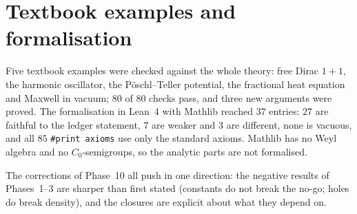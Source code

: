 \section{Textbook examples and formalisation}

Five textbook examples were checked against the whole theory: free Dirac $1+1$, the harmonic oscillator, the P\"oschl--Teller potential, the fractional heat equation and Maxwell in vacuum; $80$ of $80$ checks pass, and three new arguments were proved. The formalisation in Lean~4 with Mathlib reached $37$ entries: $27$ are faithful to the ledger statement, $7$ are weaker and $3$ are different, none is vacuous, and all $85$ \texttt{\#print axioms} use only the standard axioms. Mathlib has no Weyl algebra and no $C_0$-semigroups, so the analytic parts are not formalised.

\begin{takeaway}
The corrections of Phase~10 all push in one direction: the negative results of Phases~1--3 are sharper than first stated (constants do not break the no-go; holes do break density), and the closures are explicit about what they depend on.
\end{takeaway}
